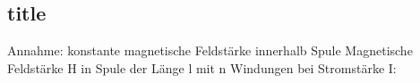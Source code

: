 \subsection*{title}
    Annahme: konstante magnetische Feldstärke innerhalb Spule
    Magnetische Feldstärke H in Spule der Länge l mit n Windungen bei Stromstärke I:
